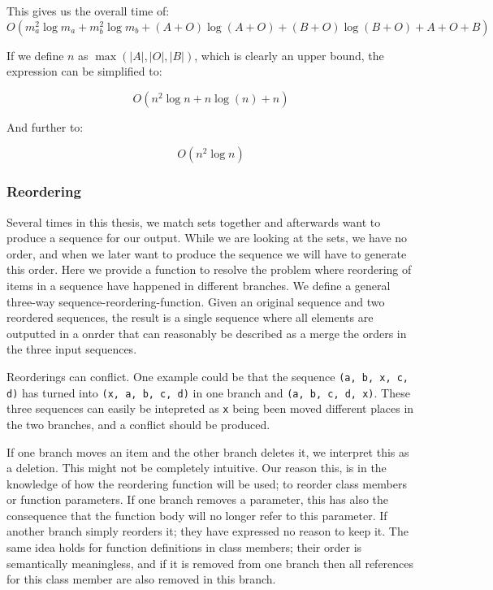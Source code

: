 \documentclass[11pt]{article}
\begin{document}
This gives us the overall time of:
\begin{equation}
O(m_{a}^2 \log m_{a} + m_{b}^2 \log m_{b} + (A+O) \log (A+O) + (B+O) \log (B+O) + A + O + B) \nonumber
\end{equation}

If we define $n$ as $\max(|A|, |O|, |B|)$, which is clearly an upper bound, the expression can be simplified to:

\begin{equation}
O(n^2 \log n + n \log (n) + n) \nonumber
\end{equation}

And further to:

\begin{equation}
O(n^2 \log n) \nonumber
\end{equation}

\subsubsection{Reordering}
\label{ThreeWayReorderingAlgorithmSec}
Several times in this thesis, we match sets together and afterwards want to produce a sequence for our output. While we are looking at the sets, we have no order, and when we later want to produce the sequence we will have to generate this order. Here we provide a function to resolve the problem where reordering of items in a sequence have happened in different branches. We define a general three-way sequence-reordering-function. Given an original sequence and two reordered sequences, the result is a single sequence where all elements are outputted in a onrder that can reasonably be described as a merge the orders in the three input sequences.

Reorderings can conflict. One example could be that the sequence \texttt{(a, b, x, c, d)} has turned into \texttt{(x, a, b, c, d)} in one branch and \texttt{(a, b, c, d, x)}. These three sequences can easily be intepreted as \texttt{x} being been moved different places in the two branches, and a conflict should be produced.

If one branch moves an item and the other branch deletes it, we interpret this as a deletion. This might not be completely intuitive. Our reason this, is in the knowledge of how the reordering function will be used; to reorder class members or function parameters. If one branch removes a parameter, this has also the consequence that the function body will no longer refer to this parameter. If another branch simply reorders it; they have expressed no reason to keep it. The same idea holds for function definitions in class members; their order is semantically meaningless, and if it is removed from one branch then all references for this class member are also removed in this branch.
\end{document}
